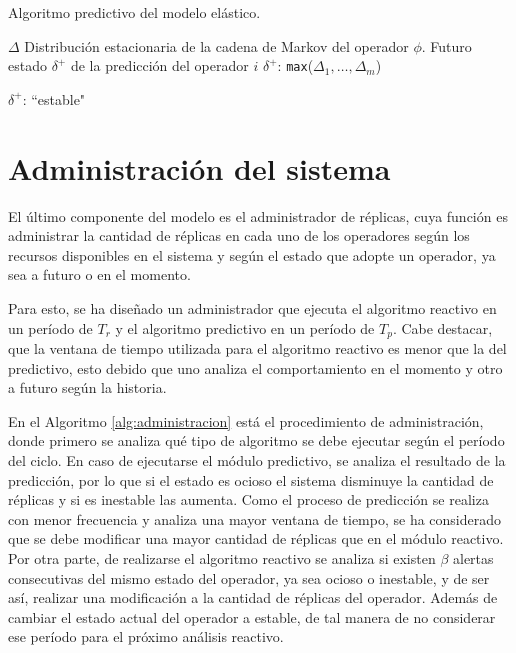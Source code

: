 \begin{algorithm}[t]
	\caption{Algoritmo predictivo del modelo el\'astico.}
	\label{alg:predictive}
	\begin{algorithmic}[1]
	\REQUIRE$\Delta$ Distribuci\'on estacionaria de la cadena de Markov del operador $\phi$.
	\ENSURE Futuro estado $\delta^{+}$ de la predicci\'on del operador $i$
		\RETURN $\delta^{+}$: \texttt{max}({$\Delta_1,\ldots,\Delta_m$})

	\ELSE
		\RETURN $\delta^{+}$: ``estable"
	\ENDIF
	\end{algorithmic}
\end{algorithm}

\section{Administraci\'on del sistema}

El \'ultimo componente del modelo es el administrador de r\'eplicas, cuya funci\'on es administrar la cantidad de r\'eplicas en cada uno de los operadores seg\'un los recursos disponibles en el sistema y seg\'un el estado que adopte un operador, ya sea a futuro o en el momento.


\normalsize{Para esto, se ha dise\~nado un administrador que ejecuta el algoritmo reactivo en un per\'iodo de $T_r$ y el algoritmo predictivo en un per\'iodo de $T_p$. Cabe destacar, que la ventana de tiempo utilizada para el algoritmo reactivo es menor que la del predictivo, esto debido que uno analiza el comportamiento en el momento y otro a futuro seg\'un la historia.}

En el Algoritmo \ref{alg:administracion} est\'a el procedimiento de administraci\'on, donde primero se analiza qu\'e tipo de algoritmo se debe ejecutar seg\'un el per\'iodo del ciclo. En caso de ejecutarse el m\'odulo predictivo, se analiza el resultado de la predicci\'on, por lo que si el estado es ocioso el sistema disminuye la cantidad de r\'eplicas y si es inestable las aumenta. Como el proceso de predicci\'on se realiza con menor frecuencia y analiza una mayor ventana de tiempo, se ha considerado que se debe modificar una mayor cantidad de r\'eplicas que en el m\'odulo reactivo. Por otra parte, de realizarse el algoritmo reactivo se analiza si existen $\beta$ alertas consecutivas del mismo estado del operador, ya sea ocioso o inestable, y de ser as\'i, realizar una modificaci\'on a la cantidad de r\'eplicas del operador. Adem\'as de cambiar el estado actual del operador a estable, de tal manera de no considerar ese per\'iodo para el pr\'oximo an\'alisis reactivo.

